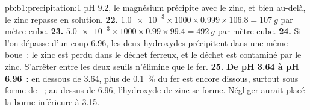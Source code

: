\begin{solution}{pb:b1:precipitation:1}
pH 9.2, le magnésium précipite avec le zinc, et bien au-delà, le zinc
repasse en solution.
\textbf{22.} $\num{1.0e-3} \times 1000 \times 0.999 \times 106.8 =
\qty{107}{g}$ par mètre cube.
\textbf{23.} $\num{5.0e-3} \times 1000 \times 0.99 \times 99.4 =
\qty{492}{g}$ par mètre cube.
\textbf{24.} Si l'on dépasse d'un coup 6.96, les deux hydroxydes
précipitent dans une même boue~: le zinc est perdu dans le déchet ferreux,
et le déchet est contaminé par le zinc. S'arrêter entre les deux seuils
n'élimine que le fer.
\textbf{25.} \textbf{De pH 3.64 à pH 6.96}~: en dessous de 3.64, plus
de \qty{0.1}{\percent} du fer est encore dissous, surtout sous forme de
~; au-dessus de 6.96, l'hydroxyde de zinc se forme. Négliger
 aurait placé la borne inférieure à 3.15.
\end{solution}
